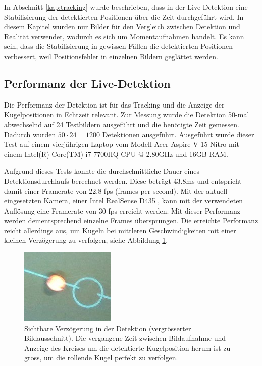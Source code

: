 In Abschnitt \ref{kap:tracking} wurde beschrieben, dass in der Live-Detektion eine Stabilisierung der detektierten Positionen
über die Zeit durchgeführt wird.
In diesem Kapitel wurden nur Bilder für den Vergleich zwischen Detektion und Realität verwendet, wodurch es sich um Momentaufnahmen handelt.
Es kann sein, dass die Stabilisierung in gewissen Fällen die detektierten Positionen verbessert,
weil Positionsfehler in einzelnen Bildern geglättet werden.

\subsection{Performanz der Live-Detektion}
Die Performanz der Detektion ist für das Tracking und die Anzeige der Kugelpositionen in Echtzeit relevant.
Zur Messung wurde die Detektion 50-mal abwechselnd auf 24 Testbildern ausgeführt und die benötigte Zeit gemessen.
Dadurch wurden $50 \cdot 24 = 1200$ Detektionen ausgeführt.
Ausgeführt wurde dieser Test auf einem vierjährigen Laptop vom Modell Acer Aspire V 15 Nitro mit
einem Intel(R) Core(TM) i7-7700HQ CPU @ 2.80GHz und 16GB RAM.

Aufgrund dieses Tests konnte die durchschnittliche Dauer eines Detektionsdurchlaufs berechnet werden.
Diese beträgt 43.8ms und entspricht damit einer Framerate von 22.8 fps (frames per second).
Mit der aktuell eingesetzten Kamera, einer Intel RealSense D435 \cite{project2:aufbau}, kann mit der verwendeten Auflösung eine Framerate von
30 fps erreicht werden.
Mit dieser Performanz werden dementsprechend einzelne Frames übersprungen.
Die erreichte Performanz reicht allerdings aus, um Kugeln bei mittleren Geschwindigkeiten mit einer kleinen Verzögerung
zu verfolgen, siehe Abbildung \ref{fig:detection_delay}.

\begin{figure}[h!]
    \begin{center}
        \includegraphics[width=0.4\linewidth]{../common/04_results/resources/detection_delay.jpg}
    \end{center}
    \caption{
        Sichtbare Verzögerung in der Detektion (vergrösserter Bildausschnitt).
        Die vergangene Zeit zwischen Bildaufnahme und Anzeige des Kreises um die detektierte Kugelposition herum ist zu gross,
        um die rollende Kugel perfekt zu verfolgen.
    }
    \label{fig:detection_delay}
\end{figure}

